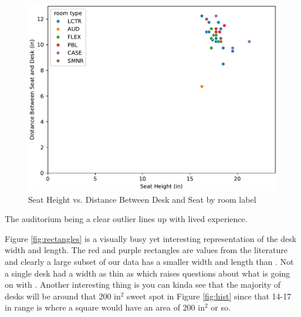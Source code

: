 \documentclass[conference]{IEEEtran}
\begin{document}
\begin{figure}[H]
    \centering
    \includegraphics[width=\linewidth]{vis/height vs width.pdf}
    \caption{Seat Height vs. Distance Between Desk and Seat by room label}
    \label{fig:seat_desk_height}
\end{figure}

The auditorium being a clear outlier  lines up with lived experience. 

Figure \ref*{fig:rectangles} is a visually busy yet interesting representation of the desk width and length. The red and purple rectangles are values from the literature and clearly a large subset of our data has a smaller width and length than \cite{mohamed}. Not a single desk had a width as thin as \cite{Ansari} which raises questions about what is going on with \cite{Ansari}. Another interesting thing is you can kinda see that the majority of desks will be around that 200 in$^2$ sweet spot in Figure \ref*{fig:hist} since that 14-17 in range is where a square would have an area of 200 in$^2$ or so.
\end{document}
